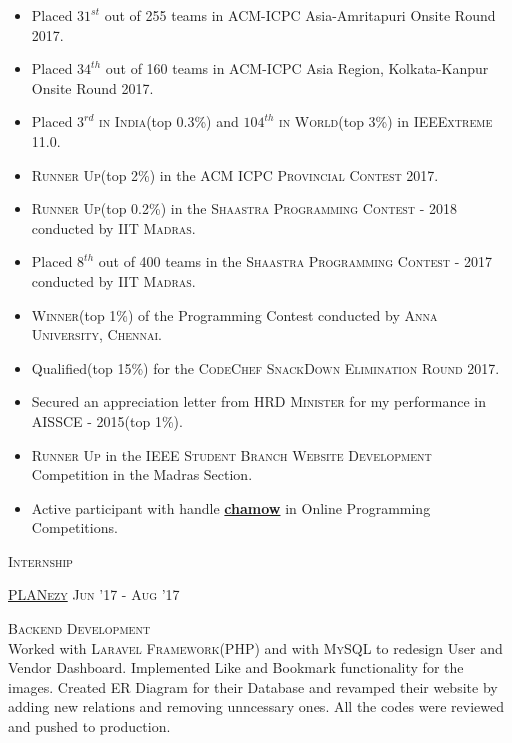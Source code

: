 \documentclass[11pt]{article}
\begin{document}
	\begin{itemize}
	\setlength\itemsep{-0.25em}
	\item Placed \textsc{$31^{st}$} out of 255 teams in \textsc{ACM-ICPC} Asia-Amritapuri Onsite Round 2017.
	\item Placed \textsc{$34^{th}$} out of 160 teams in \textsc{ACM-ICPC} Asia Region, Kolkata-Kanpur Onsite Round 2017.
	\item Placed \textsc{$3^{rd}$ in India}(top 0.3\%) and \textsc{$104^{th}$ in World}(top 3\%) in \textsc{IEEExtreme 11.0}.
	\item \textsc{Runner Up}(top 2\%) in the \textsc{ACM ICPC Provincial Contest 2017}.
	\item \textsc{Runner Up}(top 0.2\%) in the \textsc{Shaastra Programming Contest - 2018} conducted by \textsc{IIT Madras}.
	\item Placed \textsc{$8^{th}$} out of 400 teams in the \textsc{Shaastra Programming Contest - 2017} conducted by \textsc{IIT Madras}.
	\item \textsc{Winner}(top 1\%) of the Programming Contest conducted by \textsc{Anna University, Chennai}.
	\item Qualified(top 15\%) for the \textsc{CodeChef SnackDown Elimination Round 2017}.
	\item Secured an appreciation letter from \textsc{HRD Minister} for my performance in \textsc{AISSCE - 2015}(top 1\%).
	\item \textsc{Runner Up} in the \textsc{IEEE Student Branch Website Development} Competition in the Madras Section.
	\item Active participant with handle \textbf{\href{https://chamow97.github.io/Competitive-Coding/}{chamow}} in Online Programming Competitions.

	
	\end{itemize}
	\vspace{2mm}
	{\centering\Large{\textsc{Internship}}	\hrulefill}
	
	\vspace{2mm}
	
	\large\textsc{\href{http://planezy.com/}{PLANezy}}
	\hfill{\small{\textsc{Jun '17 - Aug '17}}}
	
	\begin{changemargin}{1.0cm}{0.0cm} 
	{
	\large{\textsc{{Backend Development}}}  \\
	\small{Worked with \textsc{Laravel Framework}(PHP) and with \textsc{MySQL} to redesign User and Vendor Dashboard. Implemented Like and Bookmark functionality for the images. Created ER Diagram for their Database and revamped their website by adding new relations and removing unncessary ones. All the codes were reviewed and pushed to production. } 		
	}
	\end{changemargin} 	 	
	\vspace{2mm}
\end{document}
